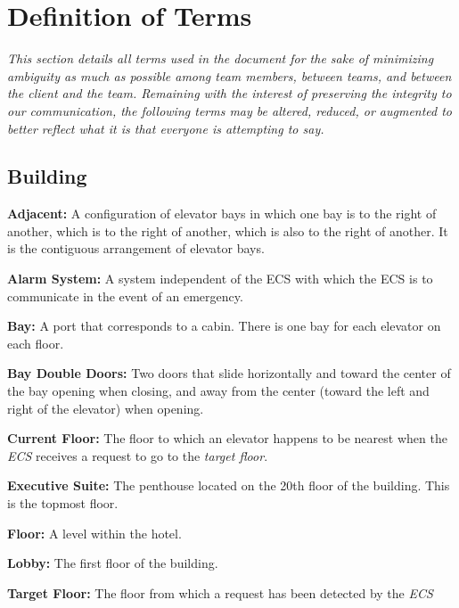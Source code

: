 \documentclass[12pt]{article}
\begin{document}
\section{Definition of Terms} %
\label{def}
\textit{This section details all terms used in the document for the sake of minimizing ambiguity as much as possible among team members, between teams, and between the client and the team. Remaining with the interest of preserving the integrity to our communication, the following terms may be altered, reduced, or augmented to better reflect what it is that everyone is attempting to say.}
\pagebreak
\subsection{Building}
\begin{list}{•}{•}
	\item \textbf{Adjacent:} A configuration of elevator bays in which one bay is to the right of another, which is to the right of another, which is also to the right of another. It is the contiguous arrangement of elevator bays.
	\item \textbf{Alarm System:} A system independent of the ECS with which the ECS is to communicate in the event of an emergency.
	\item \textbf{Bay:} A port that corresponds to a cabin. There is one bay for each elevator on each floor.
	\item \textbf{Bay Double Doors:} Two doors that slide horizontally and toward the center of 
	the bay opening when closing, and away from the center (toward the left and right of the 
	elevator) when opening.
	\item \textbf{Current Floor:} The floor to which an elevator happens to be nearest when the 
	\textit{ECS} receives a request to go to the \textit{target floor}.
	\item \textbf{Executive Suite:} The penthouse located on the 20th floor of the building. This is the topmost floor.
	\item \textbf{Floor:} A level within the hotel.
	\item \textbf{Lobby:} The first floor of the building.
	\item \textbf{Target Floor:} The floor from which a request has been detected by the \textit{ECS}
\end{list} 
\end{document}
